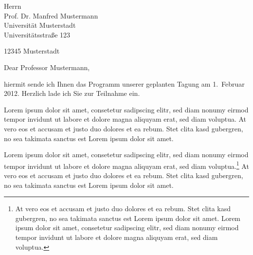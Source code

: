 \documentclass[foldmarks,rightdate,twoside,a4paper]{hhuletter}
\begin{document}
\fontsize{11}{13pt}\selectfont

\begin{letter}{Herrn\\
Prof. Dr. Manfred Mustermann\\
Universität Musterstadt\\
Universitätsstraße 123

12345 Musterstadt}








\signature{}


\subject{Einladung zur Mustertagung}



\opening{Dear Professor Mustermann,}

\raggedright %

hiermit sende ich Ihnen das Programm unserer geplanten Tagung am 1.~Februar 2012.
Herzlich lade ich Sie zur Teilnahme ein.

Lorem ipsum dolor sit amet, consetetur sadipscing elitr, sed diam nonumy
eirmod tempor invidunt ut labore et dolore magna aliquyam erat, sed diam
voluptua. At vero eos et accusam et justo duo dolores et ea rebum. Stet
clita kasd gubergren, no sea takimata sanctus est Lorem ipsum dolor sit
amet. 

Lorem ipsum dolor sit amet, consetetur sadipscing elitr, sed diam nonumy
eirmod tempor invidunt ut labore et dolore magna aliquyam erat, sed diam
voluptua.\footnote{At vero eos et accusam et justo duo dolores et ea rebum. Stet
clita kasd gubergren, no sea takimata sanctus est Lorem ipsum dolor sit
amet. Lorem ipsum dolor sit amet, consetetur sadipscing elitr, sed diam
nonumy eirmod tempor invidunt ut labore et dolore magna aliquyam erat, sed
diam voluptua.} At vero eos et accusam et justo duo dolores et ea rebum. Stet
clita kasd gubergren, no sea takimata sanctus est Lorem ipsum dolor sit
amet.   


\end{letter}
\end{document}
